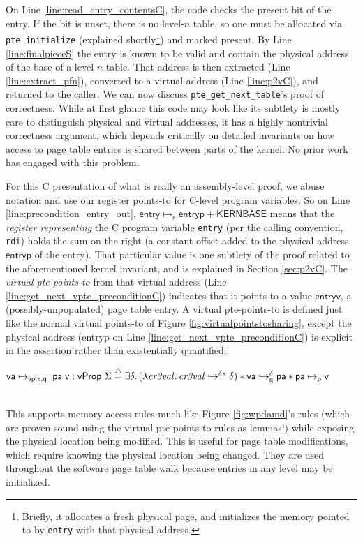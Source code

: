 On Line \ref{line:read_entry_contentsC}, the code checks the present bit of the entry.
If the bit is unset, there is no level-$n$ table, so one must be allocated via \lstinline|pte_initialize| (explained shortly\footnote{
  Briefly, it allocates a fresh physical page, and initializes the memory pointed to by \lstinline|entry| with that physical address.
}) and marked present.
By Line \ref{line:finalpieceS} the entry is known to be valid and contain the physical address of
the base of a level $n$ table. That address is then extracted (Line \ref{line:extract_pfn}),
converted to a virtual address (Line \ref{line:p2vC}), and returned to the caller.
We can now discuss \lstinline|pte_get_next_table|'s proof of correctness.
While at first glance this code may look like its subtlety is mostly care to distinguish physical and virtual addresses,
it has a highly nontrivial correctness argument, which depends critically on detailed invariants on how access to page table
entries is shared between parts of the kernel. No prior work has engaged with this problem.

For this C presentation of what is really an assembly-level proof, we abuse notation and
use our register points-to for C-level program variables. So on Line \ref{line:precondition_entry_out},
$\mathsf{entry} \mapsto_r \mathsf{entryp+KERNBASE}$ means that the \emph{register representing} the C program variable
\lstinline|entry| (per the calling convention, \lstinline|rdi|) holds the sum on the right (a constant offset added to the physical address $\mathsf{entryp}$ of the entry).
That particular value is one subtlety of the proof related to the aforementioned kernel invariant, and is explained in Section \ref{sec:p2vC}.
The \emph{virtual pte-points-to} from that virtual address (Line \ref{line:get_next_vpte_preconditionC}) indicates that it points to a value
$\mathsf{entryv}$, a (possibly-unpopulated) page table entry.
A virtual pte-points-to is defined just like the normal virtual points-to of Figure \ref{fig:virtualpointstosharing},
except the physical address (\textsf{entryp} on Line \ref{line:get_next_vpte_preconditionC}) is explicit in the assertion
rather than existentially quantified:\\
\centerline{$
    \vaddr\mapsto_{\textsf{vpte,q}} \; \paddr \; \vpage : \mathsf{vProp}~\Sigma \stackrel{\triangle}{=} 
    \exists \delta\ldotp
	(\lambda \mathit{cr3val}\ldotp
	\ghostmaptoken{\delta{}s}{\mathit{cr3val}}{\delta}) \ast 
  \fracghostmaptoken{\delta}{\vaddr}{\paddr}{\qfrac} \ast \paddr \mapsto_{\mathsf{p}} \vpage
$}\\
This supports memory access rules much like Figure \ref{fig:wpdamd}'s rules (which are proven
sound using the virtual pte-points-to rules as lemmas!)
while exposing the physical location being modified.
This is useful for page table modifications, which require knowing the physical location being changed.
They are used throughout the software page table walk because entries in any level may be initialized.

